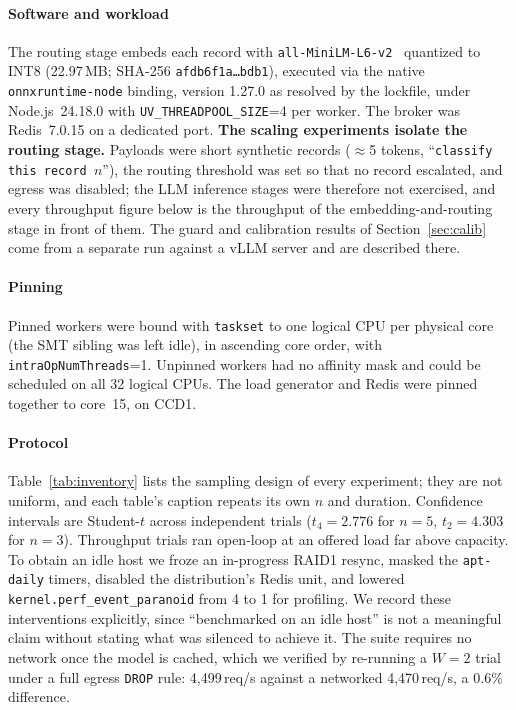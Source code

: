 \documentclass[conference]{IEEEtran}
\begin{document}
\paragraph{Software and workload} The routing stage embeds each record with \texttt{all-MiniLM-L6-v2}~\cite{minilm,sbert} quantized to INT8 (22.97\,MB; SHA-256 \texttt{afdb6f1a\ldots bdb1}), executed via the native \texttt{onnxruntime-node} binding, version 1.27.0 as resolved by the lockfile, under Node.js~24.18.0 with \texttt{UV\_THREADPOOL\_SIZE}=4 per worker. The broker was Redis~7.0.15 on a dedicated port. \textbf{The scaling experiments isolate the routing stage.} Payloads were short synthetic records (${\approx}$5 tokens, ``\texttt{classify this record $n$}''), the routing threshold was set so that no record escalated, and egress was disabled; the LLM inference stages were therefore not exercised, and every throughput figure below is the throughput of the embedding-and-routing stage in front of them. The guard and calibration results of Section~\ref{sec:calib} come from a separate run against a vLLM server and are described there.

\paragraph{Pinning} Pinned workers were bound with \texttt{taskset} to one logical CPU per physical core (the SMT sibling was left idle), in ascending core order, with \texttt{intraOpNumThreads}=1. Unpinned workers had no affinity mask and could be scheduled on all 32 logical CPUs. The load generator and Redis were pinned together to core~15, on CCD1.

\paragraph{Protocol} Table~\ref{tab:inventory} lists the sampling design of every experiment; they are not uniform, and each table's caption repeats its own $n$ and duration. Confidence intervals are Student-$t$ across independent trials ($t_{4}{=}2.776$ for $n{=}5$, $t_{2}{=}4.303$ for $n{=}3$). Throughput trials ran open-loop at an offered load far above capacity. To obtain an idle host we froze an in-progress RAID1 resync, masked the \texttt{apt-daily} timers, disabled the distribution's Redis unit, and lowered \texttt{kernel.perf\_event\_paranoid} from 4 to 1 for profiling. We record these interventions explicitly, since ``benchmarked on an idle host'' is not a meaningful claim without stating what was silenced to achieve it. The suite requires no network once the model is cached, which we verified by re-running a $W{=}2$ trial under a full egress \texttt{DROP} rule: 4{,}499\,req/s against a networked 4{,}470\,req/s, a 0.6\% difference.
\end{document}
